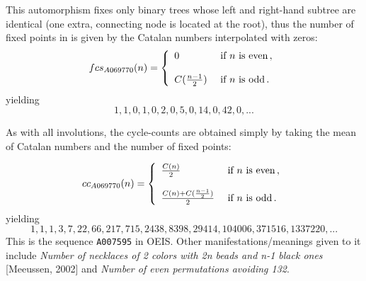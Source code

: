 \documentclass[11pt]{article} %
\newcommand{\eeq}{\end{equation}}
\newcommand{\beql}[1]{\begin{equation}\label{#1}}
\def\oratio#1#2{{#1\over #2}}
\newcommand{\autname}[1]{{\it *#1}}
\newcommand{\automorphism}[1]{automorphism~\autname{#1}}
\newcommand{\EISseq}[1]{{\tt #1}}
\newcommand{\fixarrow}{\ensuremath{\circ}}
\begin{document}

This automorphism fixes only binary trees whose left and right-hand subtree are
identical (one extra, connecting node is located at the root),
thus the number of fixed points in {\Subrange} is given by the
Catalan numbers interpolated with zeros:
\beql{Eqfc_A069770}
\aligned
fcs_{A069770}(n) = \left\{ \begin{array}{lll}
0 & \mbox{~if~}n\mbox{~is~even}\, , \\
\\
C({n-1\over2}) & \mbox{~if~}n\mbox{~is~odd}\, . \\
\end{array} \right.
\endaligned
\eeq
yielding
$$
    1,1,0,1,0,2,0,5,0,14,0,42,0,...
$$

As with all involutions, the cycle-counts are obtained simply
by taking the mean of Catalan numbers and the number of fixed points:

\beql{EQcc_A069770} %
\aligned
cc_{A069770}(n) = \left\{ \begin{array}{lll}
{C(n) \over 2} & \mbox{~if~}n\mbox{~is~even}\, , \\
\\
\oratio{C(n) + C(\oratio{n-1}{2})}{2} & \mbox{~if~}n\mbox{~is~odd}\, . \\
\end{array} \right.
\endaligned
\eeq
yielding
$$
1,1,1,3,7,22,66,217,715,2438,8398,29414,104006,371516,1337220,...
$$
This is the sequence \EISseq{A007595} in OEIS.
Other manifestations/meanings given to it include
{\em Number of necklaces of 2 colors with 2n beads and n-1 black
  ones} [Meeussen, 2002] %
and {\em Number of even permutations avoiding 132}.
\end{document}
